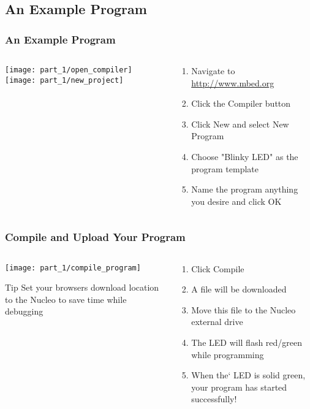 \subsection{An Example Program}
\begin{frame}
	\frametitle{An Example Program}
	\begin{columns}[T]
		\begin{column}{0.5\textwidth}
			\texttt{[image: part\_1/open\_compiler]}
			\vspace{1ex}
			\texttt{[image: part\_1/new\_project]}
		\end{column}
		\begin{column}{0.5\textwidth}
			\begin{enumerate}
				\item Navigate to \url{http://www.mbed.org}
				\item Click the Compiler button
				\item Click New and select New Program
				\item Choose "Blinky LED" as the program template
				\item Name the program anything you desire and click OK
			\end{enumerate}
		\end{column}
	\end{columns}
\end{frame}

\begin{frame}
	\frametitle{Compile and Upload Your Program}
	\begin{columns}[T]
		\begin{column}{0.5\textwidth}
			\texttt{[image: part\_1/compile\_program]}
			\begin{block}{Tip}
				Set your browsers download location to the Nucleo to save time while debugging
			\end{block}
		\end{column}
		\begin{column}{0.5\textwidth}
			\begin{enumerate}
				\item Click Compile
				\item A file will be downloaded
				\item Move this file to the Nucleo external drive
				\item The LED will flash red/green while programming
				\item When the` LED is solid green, your program has started successfully!
			\end{enumerate}
		\end{column}
	\end{columns}
\end{frame}

